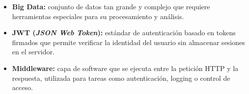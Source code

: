 \documentclass[journal]{IEEEtran}
\begin{document}
\begin{itemize}[leftmargin=*, label=\textbullet, itemsep=2pt]
		\item \textbf{Big Data:} conjunto de datos tan grande y
		complejo que requiere herramientas especiales para su
		procesamiento y an\'{a}lisis.
		
		\item \textbf{JWT (\textit{JSON Web Token}):} est\'{a}ndar
		de autenticaci\'{o}n basado en tokens firmados que permite
		verificar la identidad del usuario sin almacenar sesiones
		en el servidor.
		
		\item \textbf{Middleware:} capa de software que se ejecuta
		entre la petici\'{o}n HTTP y la respuesta, utilizada para
		tareas como autenticaci\'{o}n, logging o control de acceso.
	\end{itemize}
	
	
	
\end{document}
